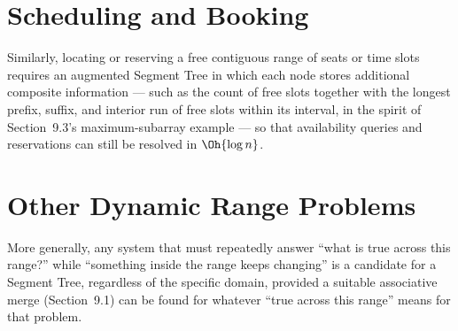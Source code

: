 \section{Scheduling and Booking}
Similarly, locating or reserving a free contiguous range of seats or time slots requires an augmented Segment Tree in which each node stores additional composite information --- such as the count of free slots together with the longest prefix, suffix, and interior run of free slots within its interval, in the spirit of Section~9.3's maximum-subarray example --- so that availability queries and reservations can still be resolved in $\Oh{\log n}$.

\section{Other Dynamic Range Problems}
More generally, any system that must repeatedly answer ``what is true across this range?'' while ``something inside the range keeps changing'' is a candidate for a Segment Tree, regardless of the specific domain, provided a suitable associative merge (Section~9.1) can be found for whatever ``true across this range'' means for that problem.
